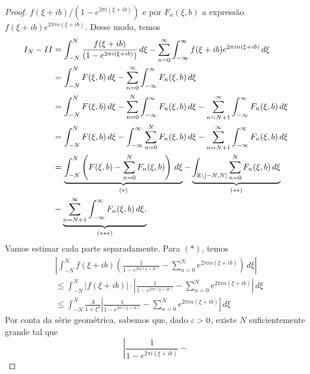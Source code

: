 \begin{proof}
        $f(\xi + ib)/(1 - e^{2\pi i(\xi + ib)})$ e por $F_n(\xi,b)$ a expressão 
        $f(\xi + ib)e^{2\pi in(\xi + ib)}$. Desse modo, temos
        \begin{align*}
            I_N - II &= \int_{-N}^{N} \frac{f(\xi + ib)}{(1 - e^{2\pi i(\xi + ib)})}
            \, d\xi - \sum_{n=0}^{\infty}\int_{-\infty}^{\infty} f(\xi + ib)
            e^{2\pi in(\xi + ib)} \, d\xi \\
            &=\int_{-N}^{N} F(\xi,b) \, d\xi -
            \sum_{n=0}^{\infty}\int_{-\infty}^{\infty}F_n(\xi,b) \, d\xi \\
            &= \int_{-N}^{N} F(\xi,b) \, d\xi - 
            \sum_{n=0}^{N}\int_{-\infty}^{\infty}F_n(\xi,b) \, d\xi - 
            \sum_{n= N+1}^{\infty}\int_{-\infty}^{\infty}F_n(\xi,b) \, d\xi\\
            &= \int_{-N}^{N} F(\xi,b) \, d\xi - \int_{-\infty}^{\infty} 
            \sum_{n=0}^{N}F_n(\xi,b) \, d\xi - 
            \sum_{n= N+1}^{\infty}\int_{-\infty}^{\infty}F_n(\xi,b) \, d\xi\\
            &= \underbrace{\int_{-N}^{N} \left(F(\xi,b) - \sum_{n=0}^{N}F_n(\xi,b) 
            \right)\, d\xi}_{(*)} - 
            \underbrace{\int_{\mathbb{R} \setminus [-N,N]}\sum_{n=0}^{N}F_n(\xi,b) 
            \, d\xi}_{(**)} \\ &- 
            \underbrace{\sum_{n= N+1}^{\infty}\int_{-\infty}^{\infty}F_n(\xi,b) 
            \, d\xi.}_{(***)}
        \end{align*}
        Vamos estimar cada parte separadamente. Para $(*)$, temos
        \begin{align*}
            &\left|\int_{-N}^{N} f(\xi + ib)\left(\frac{1}{1 - e^{2\pi i(\xi + ib)}} - \sum_{n=0}^{N}e^{2\pi i n(\xi + ib)}\right) \, d\xi \right| \\
            &\leq \int_{-N}^{N} |f(\xi + ib)|\cdot\left|\frac{1}{1 - e^{2\pi i(\xi + ib)}} - \sum_{n=0}^{N}e^{2\pi i n(\xi + ib)}\right| \, d\xi \\
            &\leq \int_{-N}^{N} \frac{A}{1 + \xi^2}\left|\frac{1}{1 - e^{2\pi i(\xi + ib)}} - \sum_{n=0}^{N}e^{2\pi i n(\xi + ib)}\right| \, d\xi 
        \end{align*}
        Por conta da série geométrica, sabemos que, dado $\varepsilon>0$, existe 
        $N$ suficientemente grande tal que
        \begin{equation*}
            \left|\frac{1}{1 - e^{2\pi i(\xi + ib)}} - 

\end{equation*}
\end{proof}
